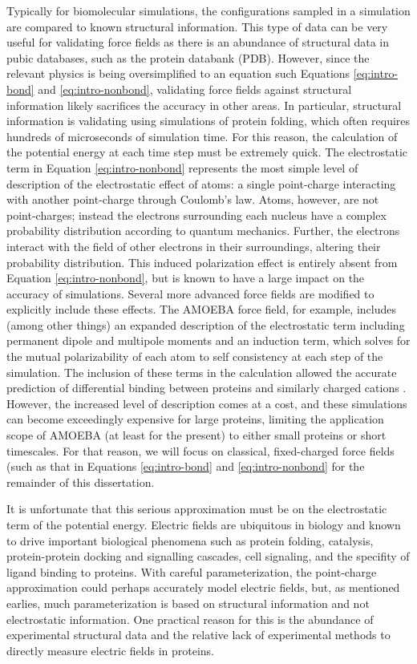 Typically for biomolecular simulations, the configurations sampled in a simulation are compared to known structural information.  
This type of data can be very useful for validating force fields as there is an abundance of structural data in pubic databases, such as the protein databank (PDB). 
However, since the relevant physics is being oversimplified to an equation such Equations \ref{eq:intro-bond} and \ref{eq:intro-nonbond}, validating force fields against structural information likely sacrifices the accuracy in other areas.
In particular, structural information is validating using simulations of protein folding, which often requires hundreds of microseconds of simulation time. 
For this reason, the calculation of the potential energy at each time step must be extremely quick. 
The electrostatic term in Equation \ref{eq:intro-nonbond} represents the most simple level of description of the electrostatic effect of atoms: a single point-charge interacting with another point-charge through Coulomb's law. 
Atoms, however, are not point-charges; instead the electrons surrounding each nucleus have a complex probability distribution according to quantum mechanics.
Further, the electrons interact with the field of other electrons in their surroundings, altering their probability distribution. 
This induced polarization effect is entirely absent from Equation \ref{eq:intro-nonbond}, but is known to have a large impact on the accuracy of simulations. 
Several more advanced force fields are modified to explicitly include these effects. 
The AMOEBA force field, for example, includes (among other things) an expanded description of the electrostatic term including permanent dipole and multipole moments and an induction term, which solves for the mutual polarizability of each atom to self consistency at each step of the simulation. 
The inclusion of these terms in the calculation allowed the accurate prediction of differential binding between proteins and similarly charged cations \cite{Jing2018}. 
However, the increased level of description comes at a cost, and these simulations can become exceedingly expensive for large proteins, limiting the application scope of AMOEBA (at least for the present) to either small proteins or short timescales. 
For that reason, we will focus on classical, fixed-charged force fields (such as that in Equations \ref{eq:intro-bond} and \ref{eq:intro-nonbond} for the remainder of this dissertation. 

It is unfortunate that this serious approximation must be on the electrostatic term of the potential energy. 
Electric fields are ubiquitous in biology and known to drive important biological phenomena such as protein folding, catalysis, protein-protein docking and signalling cascades, cell signaling, and the specifity of ligand binding to proteins. 
With careful parameterization, the point-charge approximation could perhaps accurately model electric fields, but, as mentioned earlies, much parameterization is based on structural information and not electrostatic information. 
One practical reason for this is the abundance of experimental structural data and the relative lack of experimental methods to directly measure electric fields in proteins. 

